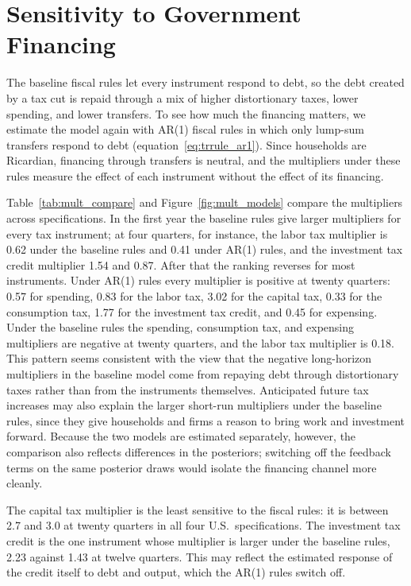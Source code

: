 \documentclass[article,11pt,letterpaper,fleqn]{article}
\theoremstyle{definition}
\numberwithin{equation}{section}
\begin{document}
\section{Sensitivity to Government Financing}
\label{sec:financing}

The baseline fiscal rules let every instrument respond to debt, so the debt created by a tax cut is repaid through a mix of higher distortionary taxes, lower spending, and lower transfers. To see how much the financing matters, we estimate the model again with AR(1) fiscal rules in which only lump-sum transfers respond to debt (equation~\ref{eq:trrule_ar1}). Since households are Ricardian, financing through transfers is neutral, and the multipliers under these rules measure the effect of each instrument without the effect of its financing.

Table~\ref{tab:mult_compare} and Figure~\ref{fig:mult_models} compare the multipliers across specifications. In the first year the baseline rules give larger multipliers for every tax instrument; at four quarters, for instance, the labor tax multiplier is 0.62 under the baseline rules and 0.41 under AR(1) rules, and the investment tax credit multiplier 1.54 and 0.87. After that the ranking reverses for most instruments. Under AR(1) rules every multiplier is positive at twenty quarters: 0.57 for spending, 0.83 for the labor tax, 3.02 for the capital tax, 0.33 for the consumption tax, 1.77 for the investment tax credit, and 0.45 for expensing. Under the baseline rules the spending, consumption tax, and expensing multipliers are negative at twenty quarters, and the labor tax multiplier is 0.18. This pattern seems consistent with the view that the negative long-horizon multipliers in the baseline model come from repaying debt through distortionary taxes rather than from the instruments themselves. Anticipated future tax increases may also explain the larger short-run multipliers under the baseline rules, since they give households and firms a reason to bring work and investment forward. Because the two models are estimated separately, however, the comparison also reflects differences in the posteriors; switching off the feedback terms on the same posterior draws would isolate the financing channel more cleanly.

The capital tax multiplier is the least sensitive to the fiscal rules: it is between 2.7 and 3.0 at twenty quarters in all four U.S.\ specifications. The investment tax credit is the one instrument whose multiplier is larger under the baseline rules, 2.23 against 1.43 at twelve quarters. This may reflect the estimated response of the credit itself to debt and output, which the AR(1) rules switch off.
\end{document}
